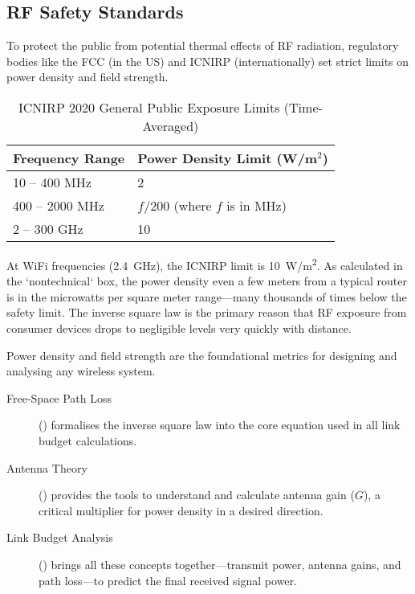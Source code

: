 \subsection{RF Safety Standards}

To protect the public from potential thermal effects of RF radiation, regulatory bodies like the FCC (in the US) and ICNIRP (internationally) set strict limits on power density and field strength.

\begin{table}[H]
    \centering
    \caption{ICNIRP 2020 General Public Exposure Limits (Time-Averaged)}
    \label{tab:icnirp-limits}
    \begin{tabular}{@{}ll@{}}
        \toprule
        \tableheaderfont Frequency Range & \tableheaderfont Power Density Limit (W/m$^2$) \\
        \midrule
        10 -- 400 MHz & 2 \\
        400 -- 2000 MHz & $f/200$ (where $f$ is in MHz) \\
        2 -- 300 GHz & 10 \\
        \bottomrule
    \end{tabular}
\end{table}

\begin{importantbox}[title={Safety in Context}]
    At WiFi frequencies (\qty{2.4}{GHz}), the ICNIRP limit is \qty{10}{W/m^2}. As calculated in the `nontechnical` box, the power density even a few meters from a typical router is in the microwatts per square meter range---many thousands of times below the safety limit. The inverse square law is the primary reason that RF exposure from consumer devices drops to negligible levels very quickly with distance.
\end{importantbox}


\begin{importantbox}[title={Further Reading}]
    Power density and field strength are the foundational metrics for designing and analysing any wireless system.
    \begin{description}
        \item[Free-Space Path Loss] () formalises the inverse square law into the core equation used in all link budget calculations.
        \item[Antenna Theory] () provides the tools to understand and calculate antenna gain ($G$), a critical multiplier for power density in a desired direction.
        \item[Link Budget Analysis] () brings all these concepts together---transmit power, antenna gains, and path loss---to predict the final received signal power.
    \end{description}
\end{importantbox}
